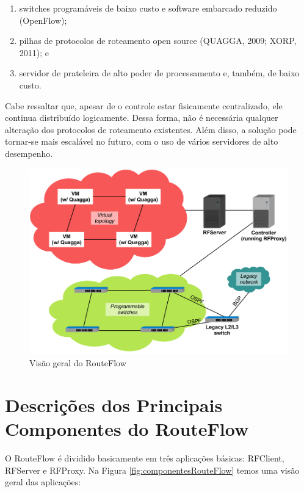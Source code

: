 \begin{enumerate}[{a)}] 
\item switches programáveis de baixo
custo e software embarcado reduzido (OpenFlow); 
\item pilhas de protocolos de roteamento open source (QUAGGA, 2009; XORP,
2011); e 
\item servidor de prateleira de alto poder de
processamento e, também, de baixo custo. 
\end{enumerate}

Cabe ressaltar que, apesar de o controle estar fisicamente
centralizado, ele continua distribuído logicamente. Dessa
forma, não é necessária qualquer alteração dos protocolos de
roteamento existentes. Além disso, a solução pode tornar-se
mais escalável no futuro, com o uso
de vários servidores de alto desempenho.

\begin{figure}[hb] \centering
\includegraphics[width=135mm]{visaoGeralRouteFlow.png}
\caption{Visão geral do RouteFlow}
\label{fig:visaoGeralRouteFlow} 
\end{figure}

\section{Descrições dos Principais Componentes do RouteFlow}
O RouteFlow é dividido basicamente em três aplicações
básicas: RFClient, RFServer e RFProxy. Na Figura
\ref{fig:componentesRouteFlow} temos uma visão geral das
aplicações:

